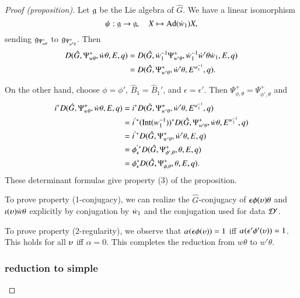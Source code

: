 \begin{proof}[Proof (proposition)]
Let ${\mathfrak g}$ be the Lie algebra of $\hat G$.  We have a linear isomorphism
\[
\psi:{\mathfrak g}\to {\mathfrak g},\quad X\mapsto {\operatorname{Ad}}(\dot w_1) X,
\]
sending ${\mathfrak g}_{\Psi_{w\theta}^+}$ to ${\mathfrak g}_{\Psi_{w'\theta}^+}$. Then
\begin{align*}
D(\hat G,\Psi_{w\theta}^+,\dot w\theta,E,q) &=
D(\hat G,\dot w_1^{-1}\Psi_{w'\theta}^+,\dot w_1^{-1}\dot w'\theta \dot w_1,E,q) \\ &=
D(\hat G,\Psi_{w'\theta}^+,\dot w'\theta,E^{w_1^{-1}},q).
\end{align*}

On the other hand, choose $\phi=\phi'$, $\hat B_1 = \hat B_1'$,
and $\epsilon=\epsilon'$.
Then  $\Psi_{\phi,\theta}^+ =\Psi_{\phi',\theta}^+$ and
\begin{align*}
i^* D(\hat G,\Psi_{w\theta}^+,\dot w\theta,E,q) &=
i^* D(\hat G,\Psi_{w'\theta}^+,\dot w'\theta,E^{w_1^{-1}},q) \\
&=i^{'*} ({\operatorname{Int}} (w_1^{-1}))^* 
  D(\hat G,\Psi_{w'\theta}^+,\dot w\theta,E^{w_1^{-1}},q) \\
&=i^{'*}  D(\hat G,\Psi_{w'\theta}^+,\dot w'\theta,E,q) \\
&=\phi_\epsilon^{'*}  D(\hat G,\Psi_{\phi',\theta}^+,\theta,E,q) \\
&=\phi_\epsilon^{*}  D(\hat G,\Psi_{\phi,\theta}^+,\theta,E,q).
\end{align*}
These determinant formulas give property (3) of the proposition.

To prove property (1-conjugacy), we can realize the $\hat G$-conjugacy
of $\epsilon\phi(\upsilon) \theta$ and $\iota(\upsilon)\dot w\theta$ explicitly by
conjugation by $\dot w_1$ and the conjugation used for data $\mathcal D'$.

To prove property (2-regularity), we observe that
$\alpha(\epsilon\phi(\upsilon))=1$ iff $\alpha(\epsilon'\phi'(\upsilon))=1$.
This holds for all $\upsilon$ iff $\alpha=0$.  This completes the reduction
from $w\theta$ to $w'\theta$.

\subsubsection{reduction to simple}


\end{proof}
